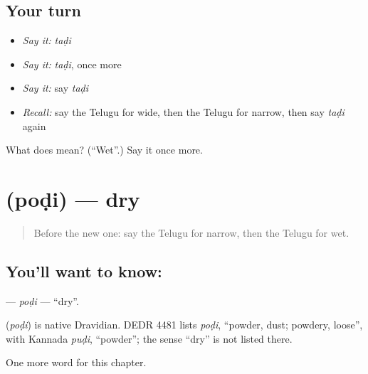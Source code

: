 \subsection*{Your turn}
\begin{itemize}
\raggedright
  \item \emph{Say it:} \emph{taḍi}
  \item \emph{Say it:} \emph{taḍi}, once more
  \item \emph{Say it:} say \emph{taḍi}
  \item \emph{Recall:} say the Telugu for wide, then the Telugu for narrow, then say \emph{taḍi} again
\end{itemize}

\begin{tcolorbox}[breakable,colback=teal!4,colframe=teal!35!black,title={Before you move on}]
What does  mean? (\textquotedblleft{}Wet\textquotedblright{}.) Say it once more.
\end{tcolorbox}
\section[\texorpdfstring{\te{పొడి} (poḍi)}{పొడి (poḍi)}]{ (poḍi) — dry}

\label{lesson:TE-C139-podi}



\begin{quote}
Before the new one: say the Telugu for narrow, then the Telugu for wet.
\end{quote}

\subsection*{You'll want to know: }
\textbf{} — \emph{poḍi} — \textquotedblleft{}dry\textquotedblright{}.

\begin{cousinweb}
\textbf{} (\emph{poḍi}) is native Dravidian. DEDR 4481 lists \emph{poḍi}, \textquotedblleft{}powder, dust; powdery, loose\textquotedblright{}, with Kannada \emph{puḍi}, \textquotedblleft{}powder\textquotedblright{}; the sense \textquotedblleft{}dry\textquotedblright{} is not listed there.
\end{cousinweb}

\begin{grammarlens}[title={What you've built}]
One more word for this chapter.
\end{grammarlens}

